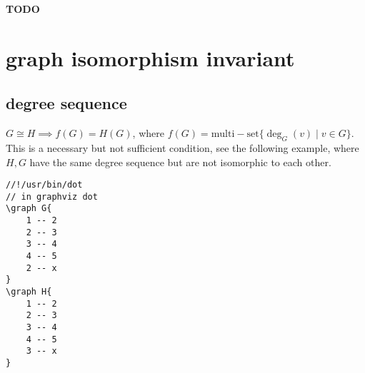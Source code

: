\documentclass{article}
\begin{document}
\textbf{TODO}



\newpage
\section{graph isomorphism invariant}

\subsection{degree sequence}

$G\cong H\implies f(G)=H(G)$, where $f(G)=\mathrm{multi-set}\{\deg_G(v)\mid v\in G\}$.\\
This is a necessary but not sufficient condition, see the following example, where $H,G$ have the same degree sequence but are not isomorphic to each other.

\begin{verbatim}
//!/usr/bin/dot
// in graphviz dot
\graph G{
	1 -- 2
	2 -- 3
	3 -- 4
	4 -- 5
	2 -- x
}
\graph H{
	1 -- 2
	2 -- 3
	3 -- 4
	4 -- 5
	3 -- x
}
\end{verbatim}
\end{document}
